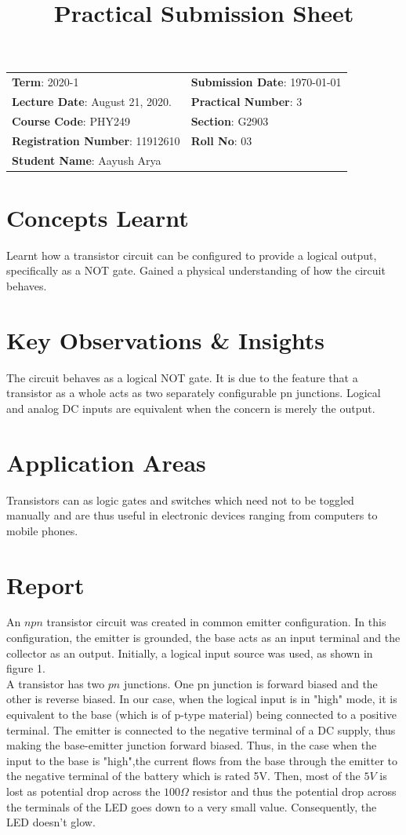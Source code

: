 \documentclass{article}
\title{Practical Submission Sheet}
\date{}
\newcommand{\bb}[1]{\textbf{#1}}
\begin{document}
	\maketitle
	\begin{tabular}{ll}
		\bb{Term}: 2020-1 & \bb{Submission Date}: \today\\
		\bb{Lecture Date}: August 21, 2020. & \bb{Practical Number}: 3\\
		\bb{Course Code}: PHY249 & \bb{Section}: G2903\\
		\bb{Registration Number}: 11912610 & \bb{Roll No}: 03\\
		\bb{Student Name}: Aayush Arya & \\
	\end{tabular}
	
	\section*{Concepts Learnt}
	Learnt how a transistor circuit can be configured to provide a logical output, specifically as a NOT gate. Gained a physical understanding of how the circuit behaves.
	
	\section*{Key Observations \& Insights}
	The circuit behaves as a logical NOT gate. It is due to the feature that a transistor as a whole acts as two separately configurable pn junctions. Logical and analog DC inputs are equivalent when the concern is merely the output.
	
	\section*{Application Areas}
	Transistors can as logic gates and switches which need not to be toggled manually and are thus useful in electronic devices ranging from computers to mobile phones.
	\section*{Report}
	An $npn$ transistor circuit was created in common emitter configuration. In this configuration, the emitter is grounded, the base acts as an input terminal and the collector as an output. Initially, a logical input source was used, as shown in figure 1. \\
	
	A transistor has two $pn$ junctions. One pn junction is forward biased and the other is reverse biased. In our case, when the logical input is in "high" mode, it is equivalent to the base (which is of p-type material) being connected to a positive terminal. The emitter is connected to the negative terminal of a DC supply, thus making the base-emitter junction forward biased. Thus, in the case when the input to the base is "high",the current flows from the base through the emitter to the negative terminal of the battery which is rated 5V. Then, most of the $5V$ is lost as potential drop across the $100\Omega$ resistor and thus the potential drop across the terminals of the LED goes down to a very small value. Consequently, the LED doesn't glow.
\end{document}
